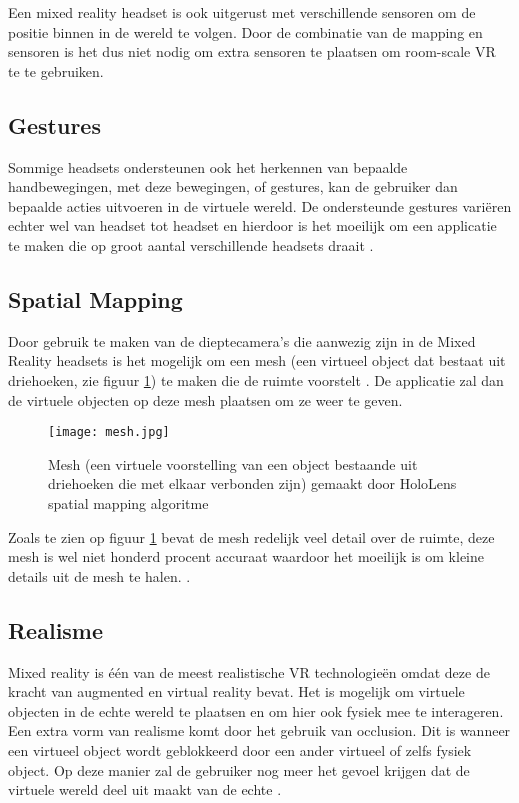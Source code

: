 Een mixed reality headset is ook uitgerust met verschillende sensoren om de positie binnen in de wereld te volgen. Door de combinatie van de mapping en sensoren is het dus niet nodig om extra sensoren te plaatsen om room-scale VR te te gebruiken.

\subsection{Gestures}
Sommige headsets ondersteunen ook het herkennen van bepaalde handbewegingen, met deze bewegingen, of gestures, kan de gebruiker dan bepaalde acties uitvoeren in de virtuele wereld. De ondersteunde gestures variëren echter wel van headset tot headset en hierdoor is het moeilijk om een applicatie te maken die op groot aantal verschillende headsets draait \autocite{MicrosoftGestures}.


\subsection{Spatial Mapping}
Door gebruik te maken van de dieptecamera's die aanwezig zijn in de Mixed Reality headsets is het mogelijk om een mesh (een virtueel object dat bestaat uit driehoeken, zie figuur \ref{fig:mesh}) te maken die de ruimte voorstelt \autocite{Evans2017}. De applicatie zal dan de virtuele objecten op deze mesh plaatsen om ze weer te geven. 

\begin{figure}
    \texttt{[image: mesh.jpg]}
    \caption{Mesh (een virtuele voorstelling van een object bestaande uit driehoeken die met elkaar verbonden zijn) gemaakt door HoloLens spatial mapping algoritme \autocite{MicrosoftSpatial}}
    \label{fig:mesh}
\end{figure}

Zoals te zien op figuur \ref{fig:mesh} bevat de mesh redelijk veel detail over de ruimte, deze mesh is wel niet honderd procent accuraat waardoor het moeilijk is om kleine details uit de mesh te halen. \autocite{Evans2017}.

\subsection{Realisme}
Mixed reality is één van de meest realistische VR technologieën omdat deze de kracht van augmented en virtual reality bevat. Het is mogelijk om virtuele objecten in de echte wereld te plaatsen en om hier ook fysiek mee te interageren. Een extra vorm van realisme komt door het gebruik van occlusion. Dit is wanneer een virtueel object wordt geblokkeerd door een ander virtueel of zelfs fysiek object. Op deze manier zal de gebruiker nog meer het gevoel krijgen dat de virtuele wereld deel uit maakt van de echte \autocite{Evans2017}.

